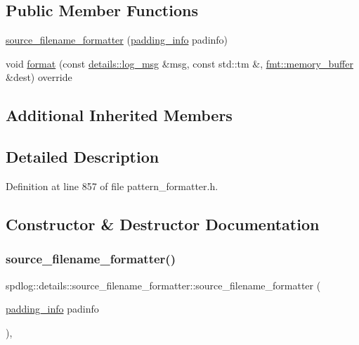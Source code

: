 \subsection*{Public Member Functions}
\begin{DoxyCompactItemize}
\item 
\hyperlink{classspdlog_1_1details_1_1source__filename__formatter_a9feacaecd2eaa3aee5eb992c7334dc9d}{source\+\_\+filename\+\_\+formatter} (\hyperlink{structspdlog_1_1details_1_1padding__info}{padding\+\_\+info} padinfo)
\item 
void \hyperlink{classspdlog_1_1details_1_1source__filename__formatter_a9a2e549eda5c8044c76281be33b04b38}{format} (const \hyperlink{structspdlog_1_1details_1_1log__msg}{details\+::log\+\_\+msg} \&msg, const std\+::tm \&, \hyperlink{format_8h_a21cbf729f69302f578e6db21c5e9e0d2}{fmt\+::memory\+\_\+buffer} \&dest) override
\end{DoxyCompactItemize}
\subsection*{Additional Inherited Members}


\subsection{Detailed Description}


Definition at line 857 of file pattern\+\_\+formatter.\+h.



\subsection{Constructor \& Destructor Documentation}
\mbox{\label{classspdlog_1_1details_1_1source__filename__formatter_a9feacaecd2eaa3aee5eb992c7334dc9d}} 
\subsubsection{\texorpdfstring{source\+\_\+filename\+\_\+formatter()}{source\_filename\_formatter()}}
{\footnotesize\ttfamily spdlog\+::details\+::source\+\_\+filename\+\_\+formatter\+::source\+\_\+filename\+\_\+formatter (\begin{DoxyParamCaption}\item[{\hyperlink{structspdlog_1_1details_1_1padding__info}{padding\+\_\+info}}]{padinfo }\end{DoxyParamCaption})\hspace{0.3cm}{\ttfamily [inline]}, {\ttfamily [explicit]}}



